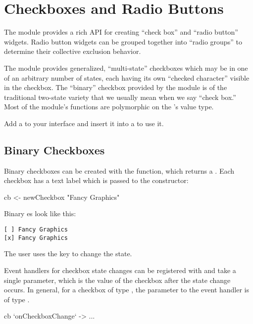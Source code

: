\section{Checkboxes and Radio Buttons}

The  module provides a rich API for creating ``check
box'' and ``radio button'' widgets.  Radio button widgets can be
grouped together into ``radio groups'' to determine their collective
exclusion behavior.

The  module provides generalized, ``multi-state''
checkboxes which may be in one of an arbitrary number of states, each
having its own ``checked character'' visible in the checkbox.  The
``binary'' checkbox provided by the module is of the traditional
two-state variety that we usually mean when we say ``check box.''
Most of the  module's functions are polymorphic on the
's value type.

Add a  to your interface and insert it into a
 to use it.

\subsection{Binary Checkboxes}

Binary checkboxes can be created with the  function,
which returns a .  Each checkbox has a
text label which is passed to the constructor:

\begin{haskellcode}
 cb <- newCheckbox "Fancy Graphics"
\end{haskellcode}

Binary es look like this:

\begin{verbatim}
[ ] Fancy Graphics
[x] Fancy Graphics
\end{verbatim}

The user uses the  key to change the  state.

Event handlers for checkbox state changes can be registered with
 and take a single parameter, which is the value
of the checkbox after the state change occurs.  In general, for a
checkbox of type , the parameter to the event
handler is of type .

\begin{haskellcode}
 cb `onCheckboxChange` \val ->
   ...
\end{haskellcode}

